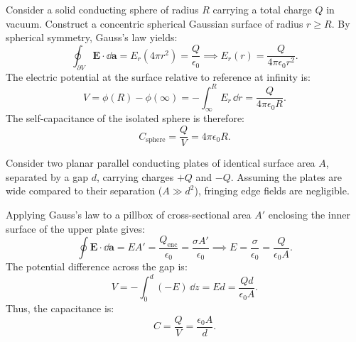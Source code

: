 \begin{example}
Consider a solid conducting sphere of radius \(R\) carrying a total charge \(Q\) in vacuum. Construct a concentric spherical Gaussian surface of radius \(r \ge R\). By spherical symmetry, Gauss's law yields:
\begin{equation}
    \oint_{\partial V} \bm{E} \cdot \dd{\bm{a}} = E_r (4\pi r^2) = \frac{Q}{\epsilon_0} \implies E_r(r) = \frac{Q}{4\pi\epsilon_0 r^2}.
\end{equation}
The electric potential at the surface relative to reference at infinity is:
\begin{equation}
    V = \phi(R) - \phi(\infty) = -\int_\infty^R E_r\,\dd{r} = \frac{Q}{4\pi\epsilon_0 R}.
\end{equation}
The self-capacitance of the isolated sphere is therefore:
\begin{equation}
    C_{\text{sphere}} = \frac{Q}{V} = 4\pi\epsilon_0 R.
\end{equation}
\end{example}

\begin{example}
Consider two planar parallel conducting plates of identical surface area \(A\), separated by a gap \(d\), carrying charges \(+Q\) and \(-Q\). Assuming the plates are wide compared to their separation (\(A \gg d^2\)), fringing edge fields are negligible.

\begin{center}
\end{center}

Applying Gauss's law to a pillbox of cross-sectional area \(A'\) enclosing the inner surface of the upper plate gives:
\begin{equation}
    \oint \bm{E} \cdot \dd{\bm{a}} = E A' = \frac{Q_{\text{enc}}}{\epsilon_0} = \frac{\sigma A'}{\epsilon_0} \implies E = \frac{\sigma}{\epsilon_0} = \frac{Q}{\epsilon_0 A}.
\end{equation}
The potential difference across the gap is:
\begin{equation}
    V = -\int_{0}^{d} (-E)\,\dd{z} = E d = \frac{Q d}{\epsilon_0 A}.
\end{equation}
Thus, the capacitance is:
\begin{equation}
    C = \frac{Q}{V} = \frac{\epsilon_0 A}{d}.
\end{equation}
\end{example}

